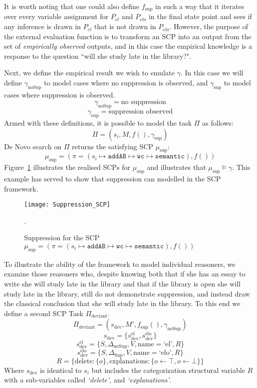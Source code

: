 It is worth noting that one could also define $f_\text{sup}$ in such a way that it iterates over every variable assignment for $P_{el}$ and $P_{elo}$ in the final state point and sees if any inference is drawn in $P_{el}$ that is not drawn in $P_{elo}$. However, the purpose of the external evaluation function is to transform an SCP into an output from the set of \textit{empirically observed} outputs, and in this case the empirical knowledge is a response to the question ``will she study late in the library?".

Next, we define the empirical result we wish to emulate $\gamma$. In this case we will define $\gamma_\text{noSup}$ to model cases where no suppression is observed, and $\gamma_{\text{sup}}$ to model cases where suppression is observed.
\[\gamma_{\text{noSup}} = \text{no suppression} \]
\[\gamma_{\text{sup}} = \text{suppression observed} \]
Armed with these definitions, it is possible to model the task $\Pi$ as follows:
\[\Pi=(s_i,M,f(),\gamma_{\text{sup}})\]
De Novo search on $\Pi$ returns the satisfying SCP $\mu_\text{sup}$:
\[\mu_\text{sup}=(\pi=(s_i \longmapsto \texttt{addAB} \longmapsto \texttt{wc} \longmapsto \texttt{semantic}),f())\]
Figure~\ref{fig:Suppression_SCP} illustrates the realised SCPs for $\mu_\text{sup}$ and illustrates that $\mu_\text{sup} \models \gamma$. This example has served to show that suppression can modelled in the SCP framework.

\begin{figure}
\centering \texttt{[image: Suppression\_SCP]}
\caption{Suppression for the SCP $\mu_\text{sup}=(\pi=(s_i \longmapsto \texttt{addAB} \longmapsto \texttt{wc} \longmapsto \texttt{semantic}),f())$}.
\label{fig:Suppression_SCP}
\end{figure}


To illustrate the ability of the framework to model individual reasoners, we examine those reasoners who, despite knowing both that if she has an essay to write she will study late in the library and that if the library is open she will study late in the library, still do not demonstrate suppression, and instead draw the classical conclusion that she will study late in the library. To this end we define a second SCP Task $\Pi_\text{deviant}$.
\[\Pi_\text{deviant}=(s_\text{dev},M',f_\text{sup}(),\gamma_{\text{noSup}})\]
\[s_\text{dev}=\{s_\text{dev}^\text{el},s_\text{dev}^\text{elo}\}\]
\[s_\text{dev}^\text{el}=\{S,\Delta_\text{noSup}, V, \text{name}=\text{`el'},R\} \]
\[s_\text{dev}^\text{elo}=\{S,\Delta_\text{Sup}, V, \text{name}=\text{`elo'},R\} \]
\[
R=\{\text{delete}:\{o\}, \text{explanations}:\{o\leftarrow \top, o\leftarrow \bot\}\}
\]
Where $s_\text{dev}$ is identical to $s_i$ but includes the categorization structural variable $R$ with a sub-variables called \textit{`delete'}, and \textit{`explanations'}. 

